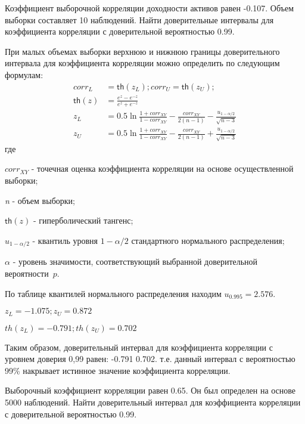 \documentclass[12pt, table, twoside, a4paper]{exam}
\begin{document}
\setcounter{section}{0\relax}%

\noindent

\normalsize
\begin{questions}
\question[20] Коэффициент выборочной корреляции доходности активов равен -0.107. Объем выборки составляет 10 наблюдений. Найти доверительные интервалы для коэффициента корреляции с доверительной вероятностью 0.99. 

\begin{solution}[6em]
	
	\raggedright
	При малых объемах выборки верхнюю и нижнюю границы доверительного интервала для коэффициента корреляции можно определить по следующим формулам:
	\begin{align}
	corr_L&=\mathsf{th}(z_L); corr_U=\mathsf{th}(z_U);\\
	\mathsf{th}(z)&=\frac{e^z-e^{-z}}{e^z+e^{-z}}\\
	z_L&=0.5\ln \frac{1+corr_{XY}}{1-corr_{XY}}-\frac{corr_{XY}}{2(n-1)}-\frac{u_{1-\alpha/2}}{\sqrt{n-3}}
	\\
	z_U&=0.5\ln \frac{1+corr_{XY}}{1-corr_{XY}}-\frac{corr_{XY}}{2(n-1)}+\frac{u_{1-\alpha/2}}{\sqrt{n-3}}
	\end{align}
	где
	
	$corr_{XY}$ - точечная оценка коэффициента корреляции на основе осуществленной выборки;
	
	\textit{n} - объем выборки;
	
	$\mathsf{th}(z)$ - гиперболический тангенс;
	
	$u_{1-\alpha/2}$ - квантиль уровня $1-\alpha/2$ стандартного нормального распределения;
	
	$\alpha$ - уровень значимости, соответствующий выбранной доверительной вероятности~$p$.
	
	По таблице квантилей нормального распределения находим $u_{0.995}=2.576$.
	
	$z_L=-1.075; z_U=0.872$
	
	$th(z_L)=-0.791; th(z_U)=0.702$
	
	Таким образом, доверительный интервал для коэффициента корреляции с уровнем доверия 0,99 равен: -0.791 0.702. т.е. данный интервал с вероятностью 99\% накрывает истинное значение коэффициента корреляции.
\end{solution}

\question[10] Выборочный коэффициент корреляции равен 0.65. Он был определен на основе 5000 наблюдений. Найти доверительный интервал для коэффициента корреляции с доверительной вероятностью 0.99.


\end{questions}
\end{document}
